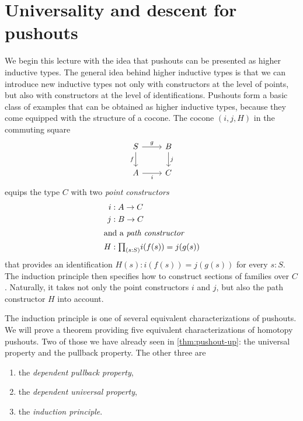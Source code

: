 \section{Universality and descent for pushouts}\label{chap:descent}

We begin this lecture with the idea that pushouts can be presented as higher inductive types. The general idea behind higher inductive types is that we can introduce new inductive types not only with constructors at the level of points, but also with constructors at the level of identifications. Pushouts form a basic class of examples that can be obtained as higher inductive types, because they come equipped with the structure of a cocone. The cocone $(i,j,H)$ in the commuting square
\begin{equation*}
  \begin{tikzcd}
    S \arrow[r,"g"] \arrow[d,swap,"f"] & B \arrow[d,"j"] \\
    A \arrow[r,swap,"i"] & C
  \end{tikzcd}
\end{equation*}
equips the type $C$ with two \emph{point constructors}
\begin{align*}
  i & : A \to C \\
  j & : B \to C \\
  \intertext{and a \emph{path constructor}}
  H & : \prd{s:S}i(f(s)) = j(g(s))
\end{align*}
that provides an identification $H(s):i(f(s))=j(g(s))$ for every $s:S$. The induction principle then specifies how to construct sections of families over $C$. Naturally, it takes not only the point constructors $i$ and $j$, but also the path constructor $H$ into account. 

The induction principle is one of several equivalent characterizations of pushouts. We will prove a theorem providing five equivalent characterizations of homotopy pushouts. Two of those we have already seen in \cref{thm:pushout-up}: the universal property and the pullback property. The other three are
\begin{enumerate}
\item the \emph{dependent pullback property},
\item the \emph{dependent universal property},
\item the \emph{induction principle}.
\end{enumerate}

